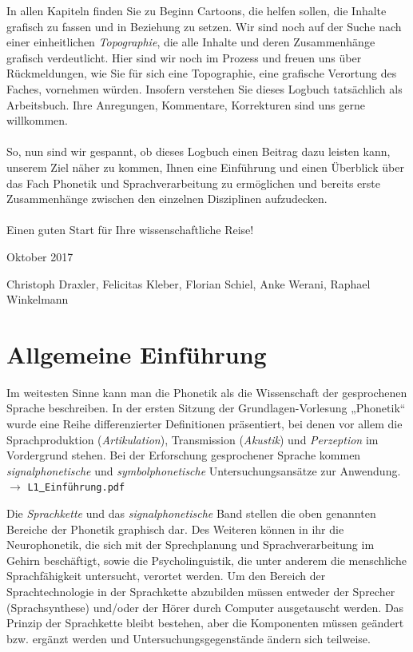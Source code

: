 \documentclass[11pt]{book}
\begin{document}
In allen Kapiteln finden Sie zu Beginn  Cartoons, die helfen sollen, die Inhalte grafisch zu fassen und in Beziehung zu setzen. Wir sind noch auf der Suche nach einer einheitlichen \textit{Topographie}, die alle Inhalte und deren Zusammenhänge grafisch verdeutlicht. Hier sind wir noch im Prozess und freuen uns über Rückmeldungen, wie Sie für sich eine Topographie, eine grafische Verortung des Faches, vornehmen würden. Insofern verstehen Sie dieses Logbuch tatsächlich als Arbeitsbuch. Ihre Anregungen, Kommentare, Korrekturen sind uns gerne willkommen.\\
\\
So, nun sind wir gespannt, ob dieses Logbuch einen Beitrag dazu leisten kann, unserem Ziel näher zu kommen, Ihnen eine Einführung und einen Überblick über das Fach Phonetik und Sprachverarbeitung zu ermöglichen und bereits erste Zusammenhänge zwischen den einzelnen Disziplinen aufzudecken.\\
\\
Einen guten Start für Ihre wissenschaftliche Reise!
\begin {flushright} 
Oktober 2017
\end{flushright}
Christoph Draxler, Felicitas Kleber, Florian Schiel, Anke Werani, Raphael Winkelmann





\chapter{Allgemeine Einführung}
Im weitesten Sinne kann man die Phonetik als die Wissenschaft der gesprochenen Sprache beschreiben. In der ersten Sitzung der Grundlagen-Vorlesung „Phonetik“ wurde eine Reihe differenzierter Definitionen präsentiert, bei denen vor allem die Sprachproduktion (\textit{Artikulation}), Transmission (\textit{Akustik}) und \textit{Perzeption} im Vordergrund stehen. Bei der Erforschung gesprochener Sprache kommen \textit{signalphonetische} und \textit{symbolphonetische} Untersuchungsansätze zur Anwendung. $\rightarrow$ {\tt L1\underline{\ }Einführung.pdf} 

Die \textit{Sprachkette} und das \textit{signalphonetische} Band stellen die oben genannten Bereiche der Phonetik graphisch dar. Des Weiteren können in ihr die Neurophonetik, die sich mit der Sprechplanung und Sprachverarbeitung im Gehirn beschäftigt, sowie die Psycholinguistik, die unter anderem die menschliche Sprachfähigkeit untersucht, verortet werden.  Um den Bereich der Sprachtechnologie in der Sprachkette abzubilden müssen entweder der Sprecher (Sprachsynthese) und/oder der Hörer durch Computer   ausgetauscht werden. Das Prinzip der Sprachkette bleibt bestehen, aber die Komponenten müssen geändert bzw. ergänzt werden und Untersuchungsgegenstände ändern sich teilweise.
\end{document}
